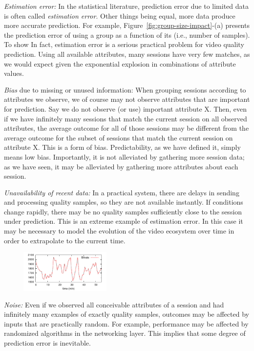 \begin{packedenumerate}
  \item \emph{Estimation error:} In the statistical literature, prediction error due to limited data is often called {\it estimation error}.  Other things being equal, more data produce more accurate prediction. For example, Figure~\ref{fig:group-size-impact}-(a) presents the prediction error of using a group as a function of its (i.e., number of samples). To show  In fact, estimation error is a serious practical problem for video quality prediction.  Using all available attributes, many sessions have very few matches, as we would expect given the exponential explosion in combinations of attribute values.  
  \item \emph{Bias} due to missing or unused information: When grouping sessions according to attributes we observe, we of course may not observe attributes that are important for prediction.  Say we do not observe (or use) important attribute X.  Then, even if we have infinitely many sessions that match the current session on all observed attributes, the average outcome for all of those sessions may be different from the average outcome for the subset of sessions that match the current session on attribute X.  This is a form of bias.  Predictability, as we have defined it, simply means low bias.  Importantly, it is not alleviated by gathering more session data; as we have seen, it may be alleviated by gathering more attributes about each session.
  \item \emph{Unavailability of recent data:} In a practical system, there are delays in sending and processing quality samples, so they are not available instantly.  If conditions change rapidly, there may be no quality samples sufficiently close to the session under prediction.  This is an extreme example of estimation error.  In this case it may be necessary to model the evolution of the video ecosystem over time in order to extrapolate to the current time.

\begin{figure}[h!]
\centering
 \includegraphics[width=0.4\textwidth] {figures/quality-time.pdf}
\label{fig:quality-variability}
\end{figure}

  \item \emph{Noise:} Even if we observed all conceivable attributes of a session and had infinitely many examples of exactly quality samples, outcomes may be affected by inputs that are practically random.  For example, performance may be affected by randomized algorithms in the networking layer.  This implies that some degree of prediction error is inevitable.
\end{packedenumerate}


